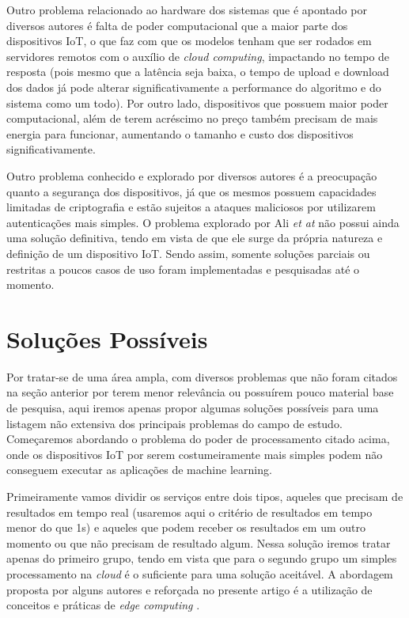 \documentclass[12pt]{article}
\begin{document}
Outro problema relacionado ao hardware dos sistemas que é apontado por diversos autores é falta de poder computacional que a maior parte dos dispositivos IoT, o que faz com que os modelos tenham que ser rodados em servidores remotos com o auxílio de \emph{cloud computing}, impactando no tempo de resposta (pois mesmo que a latência seja baixa, o tempo de upload e download dos dados já pode alterar significativamente a performance do algoritmo e do sistema como um todo). Por outro lado, dispositivos que possuem maior poder computacional, além de terem acréscimo no preço também precisam de mais energia para funcionar, aumentando o tamanho e custo dos dispositivos significativamente.

Outro problema conhecido e explorado por diversos autores é a preocupação quanto a segurança dos dispositivos, já que os mesmos possuem capacidades limitadas de criptografia e estão sujeitos a ataques maliciosos por utilizarem autenticações mais simples. O problema explorado por Ali \emph{et at} \cite{ali} não possui ainda uma solução definitiva, tendo em vista de que ele surge da própria natureza e definição de um dispositivo IoT. Sendo assim, somente soluções parciais ou restritas a poucos casos de uso foram implementadas e pesquisadas até o momento.

\section{Soluções Possíveis}

Por tratar-se de uma área ampla, com diversos problemas que não foram citados na seção anterior por terem menor relevância ou possuírem pouco material base de pesquisa, aqui iremos apenas propor algumas soluções possíveis para uma listagem não extensiva dos principais problemas do campo de estudo. Começaremos abordando o problema do poder de processamento citado acima, onde os dispositivos IoT por serem costumeiramente mais simples podem não conseguem executar as aplicações de machine learning.

Primeiramente vamos dividir os serviços entre dois tipos, aqueles que precisam de resultados em tempo real (usaremos aqui o critério de resultados em tempo menor do que 1s) e aqueles que podem receber os resultados em um outro momento ou que não precisam de resultado algum. Nessa solução iremos tratar apenas do primeiro grupo, tendo em vista que para o segundo grupo um simples processamento na \emph{cloud} é o suficiente para uma solução aceitável. A abordagem proposta por alguns autores e reforçada no presente artigo é a utilização de conceitos e práticas de \emph{edge computing} \cite{vitali}.
\end{document}
